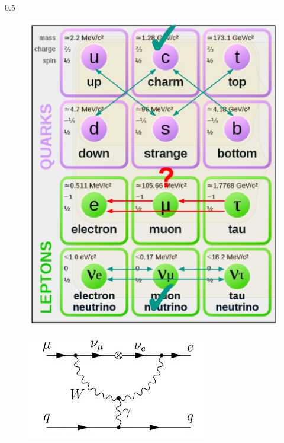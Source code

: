 \documentclass{beamer}
\begin{document}
\begin{frame}
\begin{columns}
\begin{column}{0.5\framewidth}
        \begin{figure}[h]
            \centering
            \includegraphics[width=0.7\columnwidth]{figures/png/Screenshot_20240913_102556.png}
        \end{figure} 
        
        \begin{figure}[h]
            \centering
            \includegraphics[width=0.7\columnwidth]{figures/jpg/1_erkKoywyuFzJmMv4PKpc9Q.jpg}
        \end{figure} 
    \end{column}
\end{columns}
\end{frame}

\end{document}
